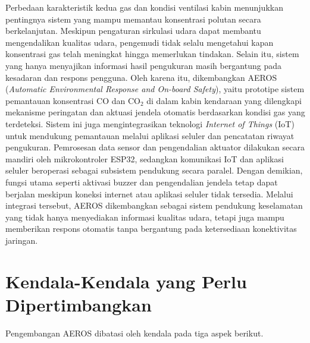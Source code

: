 Perbedaan karakteristik kedua gas dan kondisi ventilasi kabin menunjukkan pentingnya sistem yang mampu memantau konsentrasi polutan secara berkelanjutan. Meskipun pengaturan sirkulasi udara dapat membantu mengendalikan kualitas udara, pengemudi tidak selalu mengetahui kapan konsentrasi gas telah meningkat hingga memerlukan tindakan. Selain itu, sistem yang hanya menyajikan informasi hasil pengukuran masih bergantung pada kesadaran dan respons pengguna. Oleh karena itu, dikembangkan AEROS (\textit{Automatic Environmental Response and On-board Safety}), yaitu prototipe sistem pemantauan konsentrasi CO dan CO$_2$ di dalam kabin kendaraan yang dilengkapi mekanisme peringatan dan aktuasi jendela otomatis berdasarkan kondisi gas yang terdeteksi. Sistem ini juga mengintegrasikan teknologi \textit{Internet of Things} (IoT) untuk mendukung pemantauan melalui aplikasi seluler dan pencatatan riwayat pengukuran. Pemrosesan data sensor dan pengendalian aktuator dilakukan secara mandiri oleh mikrokontroler ESP32, sedangkan komunikasi IoT dan aplikasi seluler beroperasi sebagai subsistem pendukung secara paralel. Dengan demikian, fungsi utama seperti aktivasi buzzer dan pengendalian jendela tetap dapat berjalan meskipun koneksi internet atau aplikasi seluler tidak tersedia. Melalui integrasi tersebut, AEROS dikembangkan sebagai sistem pendukung keselamatan yang tidak hanya menyediakan informasi kualitas udara, tetapi juga mampu memberikan respons otomatis tanpa bergantung pada ketersediaan konektivitas jaringan.

\section{Kendala-Kendala yang Perlu Dipertimbangkan}
\label{sec:Kendala_Kendala_yang_Perlu_Dipertimbangkan}

    Pengembangan AEROS dibatasi oleh kendala pada tiga aspek berikut.


